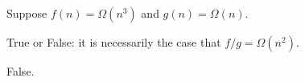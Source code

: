 \begin{prob}

    Suppose $f(n) = \Omega(n^3)$ and $g(n) = \Omega(n)$.

    True or False: it is necessarily the case that $f/g = \Omega(n^2)$.

    \tF{}

    \begin{soln}
        False.
    \end{soln}

\end{prob}
